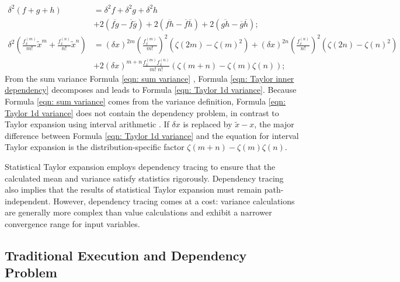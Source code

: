 \documentclass[twoside]{article}
\numberwithin{equation}{section}
\begin{document}
\begin{align}
\delta^2 (f + g + h) &= \delta^2 f + \delta^2 g + \delta^2 h  \nonumber  \\ 
\label{eqn: sum variance}
	&+ 2 (\overline{fg} - \overline{f}\overline{g}) + 2 (\overline{fh} - \overline{f}\overline{h}) + 2 (\overline{gh} - \overline{g}\overline{h}); \\
\delta^2 \left( \frac{f^{(m)}_x}{m!} \tilde{x}^m + \frac{f^{(n)}_x}{n!} \tilde{x}^n \right) &=
    (\delta x)^{2m} (\frac{f^{(m)}_x }{m!})^2 \left(\zeta(2m) - \zeta(m)^2\right) 
    	+ (\delta x)^{2n} (\frac{f^{(n)}_x }{n!})^2 \left(\zeta(2n) - \zeta(n)^2 \right)  \nonumber  \\
\label{eqn: Taylor inner dependency}
	&+ 2 (\delta x)^{m+n} \frac{f^{(m)}_x f^{(n)}_x}{m! \;n!} \left(\zeta(m+n) - \zeta(m) \zeta(n) \right);
\end{align}
From the sum variance Formula \eqref{eqn: sum variance} \cite{Probability_Statistics}, Formula \eqref{eqn: Taylor inner dependency} decomposes and leads to Formula \eqref{eqn: Taylor 1d variance}.
Because Formula \eqref{eqn: sum variance} comes from the variance definition, Formula \eqref{eqn: Taylor 1d variance} does not contain the dependency problem, in contrast to Taylor expansion using interval arithmetic \cite{Interval_Analysis, Taylor_Models, Taylor_Forms_Limits}.
If $\delta x$ is replaced by $\tilde{x} - x$, the major difference between Formula \eqref{eqn: Taylor 1d variance} and the equation for interval Taylor expansion \cite{Taylor_Models, Taylor_Forms_Limits} is the distribution-specific factor $\zeta(m+n) - \zeta(m) \zeta(n)$.

Statistical Taylor expansion employs dependency tracing to ensure that the calculated mean and variance satisfy statistics rigorously.
Dependency tracing also implies that the results of statistical Taylor expansion must remain path-independent.
However, dependency tracing comes at a cost: variance calculations are generally more complex than value calculations and exhibit a narrower convergence range for input variables.


\subsection{Traditional Execution and Dependency Problem}
\end{document}
